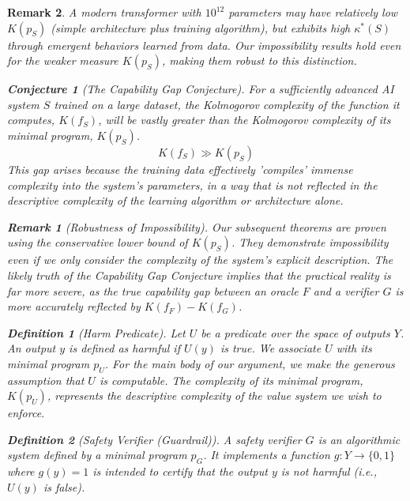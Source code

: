 \documentclass[11pt]{article}
\newtheorem{definition}{Definition}
\newtheorem{remark}{Remark}
\newtheorem{conjecture}{Conjecture}
\begin{document}
\begin{remark}

A modern transformer with $10^{12}$ parameters may have relatively low $K(p_S)$ (simple architecture plus training algorithm), but exhibits high $\kappa^*(S)$ through emergent behaviors learned from data. Our impossibility results hold even for the weaker measure $K(p_S)$, making them robust to this distinction.

\begin{conjecture}[The Capability Gap Conjecture]
For a sufficiently advanced AI system $S$ trained on a large dataset, the Kolmogorov complexity of the function it computes, $K(f_S)$, will be vastly greater than the Kolmogorov complexity of its minimal program, $K(p_S)$.
\[K(f_S) \gg K(p_S)\]
This gap arises because the training data effectively 'compiles' immense complexity into the system's parameters, in a way that is not reflected in the descriptive complexity of the learning algorithm or architecture alone.
\end{conjecture}

\begin{remark}[Robustness of Impossibility]
Our subsequent theorems are proven using the conservative lower bound of $K(p_S)$. They demonstrate impossibility even if we only consider the complexity of the system's explicit description. The likely truth of the Capability Gap Conjecture implies that the practical reality is far more severe, as the true capability gap between an oracle $F$ and a verifier $G$ is more accurately reflected by $K(f_F) - K(f_G)$.
\end{remark}

\begin{definition}[Harm Predicate]
Let $U$ be a predicate over the space of outputs $Y$. An output $y$ is defined as harmful if $U(y)$ is true. We associate $U$ with its minimal program $p_U$. For the main body of our argument, we make the generous assumption that $U$ is computable. The complexity of its minimal program, $K(p_U)$, represents the descriptive complexity of the value system we wish to enforce.
\end{definition}

\begin{definition}[Safety Verifier (Guardrail)]
A safety verifier $G$ is an algorithmic system defined by a minimal program $p_G$. It implements a function $g: Y \to \{0, 1\}$ where $g(y)=1$ is intended to certify that the output $y$ is not harmful (i.e., $U(y)$ is false).
\end{definition}


\end{remark}
\end{document}
